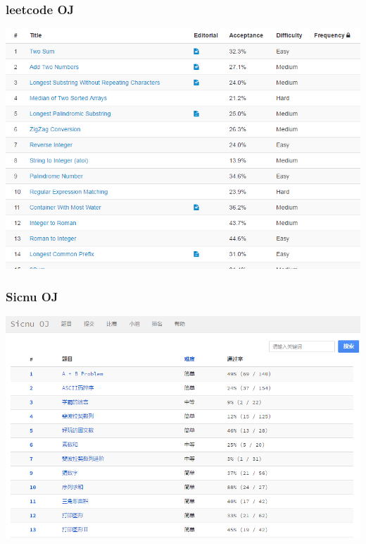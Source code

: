 \documentclass{beamer}
\begin{document}
\begin{frame}
\frametitle{leetcode OJ}
\includegraphics[scale=0.4]{leetcode-oj.png}
\end{frame}


\begin{frame}
\frametitle{Sicnu OJ}
\includegraphics[scale=0.5]{SICNU-oj.png}
\end{frame}
\end{document}
